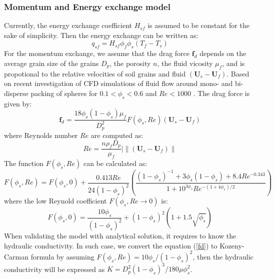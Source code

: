 \documentclass[preprint,12pt]{elsarticle}
\begin{document}
\subsubsection{Momentum and Energy exchange model}
Currently, the energy exchange coefficient $H_{sf}$ is assumed to be constant for the sake of simplicity. Then the energy exchange can be written as:
%
%
\begin{equation}
     q_{sf} = H_{sf} \phi_f \phi_s (T_f -T_s)
\end{equation}
%
%
For the momentum exchange, we assume that the drag force $\pmb{f}_{d}$ depends on the average grain size of the grains $D_p$, the porosity $n$, the fluid vicosity $\mu_f$, and is propotional to the relative velocities of soil grains and fluid $(\pmb{U}_s - \pmb{U}_f)$. Based on recent investigation of CFD simulations of fluid flow around mono- and bi-disperse packing of spheres for $0.1 < \phi_s < 0.6$ and $Re < 1000$ \cite{Drag}. The drag force is given by: \\
%
%
\begin{equation}
     \pmb{f}_{d} = \frac{18\phi_s(1-\phi_s)\mu_f}{D_p^2} F(\phi_s, Re) (\pmb{U}_s - \pmb{U}_f)  
\label{fd}
\end{equation}
%
%
where Reynolds number $Re$ are computed as:
%
%
\begin{equation}
     Re = \frac{n \rho_f D_p}{\mu_f} |\big\|(\pmb{U}_s - \pmb{U}_f)\big\|
\end{equation}
%
%
The function $F(\phi_s, Re)$ can be calculated as:
%
%
\begin{equation}
     F(\phi_s, Re)  = F(\phi_s, 0)  + \frac{0.413Re}{24 (1-\phi_s)^2} (\frac{(1-\phi_s)^{-1}+3\phi_s(1-\phi_s)+8.4Re^{-0.343}}{1+10^{3\phi_s}Re^{-(1+4\phi_s)/2}})
\end{equation}
%
%
where the low Reynold coefficient $ F(\phi_s, Re\rightarrow0)$ is:
%
%
\begin{equation}
     F(\phi_s, 0)  = \frac{10\phi_s}{ (1-\phi_s)^2}+(1-\phi_s)^2(1+1.5\sqrt{\phi_s})
\end{equation}
%
%
When validating the model with analytical solution, it requires to know the hydraulic conductivity. In such case, we convert the equation (\ref{fd}) to Kozeny-Carman formula by assuming $F(\phi_s, Re) = 10\phi_s/(1-\phi_s)^2$, then the hydraulic conductivity will be expressed as  $K = D_p^2 (1-\phi_s)^3 / 180 \mu \phi_s^2$.
\end{document}
